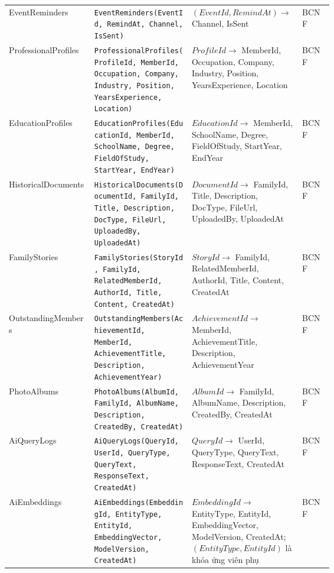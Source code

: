 \begin{center}
\begin{tabularx}{\linewidth}{@{}l>{\raggedright\arraybackslash}p{0.30\linewidth}>{\raggedright\arraybackslash}p{0.34\linewidth}l@{}}
EventReminders &
\texttt{EventReminders(EventId, RemindAt, Channel, IsSent)} &
$(EventId,RemindAt)\rightarrow$ Channel, IsSent &
BCNF \\

ProfessionalProfiles &
\texttt{ProfessionalProfiles(ProfileId, MemberId, Occupation, Company, Industry, Position, YearsExperience, Location)} &
$ProfileId \rightarrow$ MemberId, Occupation, Company, Industry, Position, YearsExperience, Location &
BCNF \\

EducationProfiles &
\texttt{EducationProfiles(EducationId, MemberId, SchoolName, Degree, FieldOfStudy, StartYear, EndYear)} &
$EducationId \rightarrow$ MemberId, SchoolName, Degree, FieldOfStudy, StartYear, EndYear &
BCNF \\

HistoricalDocuments &
\texttt{HistoricalDocuments(DocumentId, FamilyId, Title, Description, DocType, FileUrl, UploadedBy, UploadedAt)} &
$DocumentId \rightarrow$ FamilyId, Title, Description, DocType, FileUrl, UploadedBy, UploadedAt &
BCNF \\

FamilyStories &
\texttt{FamilyStories(StoryId, FamilyId, RelatedMemberId, AuthorId, Title, Content, CreatedAt)} &
$StoryId \rightarrow$ FamilyId, RelatedMemberId, AuthorId, Title, Content, CreatedAt &
BCNF \\

OutstandingMembers &
\texttt{OutstandingMembers(AchievementId, MemberId, AchievementTitle, Description, AchievementYear)} &
$AchievementId \rightarrow$ MemberId, AchievementTitle, Description, AchievementYear &
BCNF \\

PhotoAlbums &
\texttt{PhotoAlbums(AlbumId, FamilyId, AlbumName, Description, CreatedBy, CreatedAt)} &
$AlbumId \rightarrow$ FamilyId, AlbumName, Description, CreatedBy, CreatedAt &
BCNF \\

AiQueryLogs &
\texttt{AiQueryLogs(QueryId, UserId, QueryType, QueryText, ResponseText, CreatedAt)} &
$QueryId \rightarrow$ UserId, QueryType, QueryText, ResponseText, CreatedAt &
BCNF \\

AiEmbeddings &
\texttt{AiEmbeddings(EmbeddingId, EntityType, EntityId, EmbeddingVector, ModelVersion, CreatedAt)} &
$EmbeddingId \rightarrow$ EntityType, EntityId, EmbeddingVector, ModelVersion, CreatedAt; $(EntityType,EntityId)$ là khóa ứng viên phụ &
BCNF \\


\end{tabularx}
\end{center}
